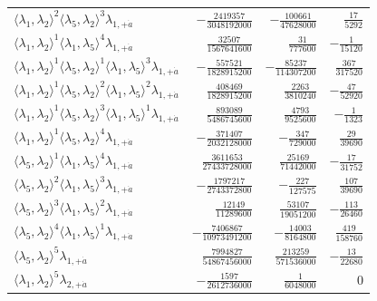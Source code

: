 \begin{longtable}{@{}lrrr@{}}
$\langle\lambda_1,\lambda_2\rangle^{2}\langle\lambda_5,\lambda_2\rangle^{3}\lambda_{1,+\dot a}$ & $-\frac{2419357}{3048192000}$ & $-\frac{100661}{47628000}$ & $\frac{17}{5292}$ \\
$\langle\lambda_1,\lambda_2\rangle^{1}\langle\lambda_1,\lambda_5\rangle^{4}\lambda_{1,+\dot a}$ & $\frac{32507}{1567641600}$ & $\frac{31}{777600}$ & $-\frac{1}{15120}$ \\
$\langle\lambda_1,\lambda_2\rangle^{1}\langle\lambda_5,\lambda_2\rangle^{1}\langle\lambda_1,\lambda_5\rangle^{3}\lambda_{1,+\dot a}$ & $-\frac{557521}{1828915200}$ & $-\frac{85237}{114307200}$ & $\frac{367}{317520}$ \\
$\langle\lambda_1,\lambda_2\rangle^{1}\langle\lambda_5,\lambda_2\rangle^{2}\langle\lambda_1,\lambda_5\rangle^{2}\lambda_{1,+\dot a}$ & $\frac{408469}{1828915200}$ & $\frac{2263}{3810240}$ & $-\frac{47}{52920}$ \\
$\langle\lambda_1,\lambda_2\rangle^{1}\langle\lambda_5,\lambda_2\rangle^{3}\langle\lambda_1,\lambda_5\rangle^{1}\lambda_{1,+\dot a}$ & $\frac{893089}{5486745600}$ & $\frac{4793}{9525600}$ & $-\frac{1}{1323}$ \\
$\langle\lambda_1,\lambda_2\rangle^{1}\langle\lambda_5,\lambda_2\rangle^{4}\lambda_{1,+\dot a}$ & $-\frac{371407}{2032128000}$ & $-\frac{347}{729000}$ & $\frac{29}{39690}$ \\
$\langle\lambda_5,\lambda_2\rangle^{1}\langle\lambda_1,\lambda_5\rangle^{4}\lambda_{1,+\dot a}$ & $\frac{3611653}{27433728000}$ & $\frac{25169}{71442000}$ & $-\frac{17}{31752}$ \\
$\langle\lambda_5,\lambda_2\rangle^{2}\langle\lambda_1,\lambda_5\rangle^{3}\lambda_{1,+\dot a}$ & $-\frac{1797217}{2743372800}$ & $-\frac{227}{127575}$ & $\frac{107}{39690}$ \\
$\langle\lambda_5,\lambda_2\rangle^{3}\langle\lambda_1,\lambda_5\rangle^{2}\lambda_{1,+\dot a}$ & $\frac{12149}{11289600}$ & $\frac{53107}{19051200}$ & $-\frac{113}{26460}$ \\
$\langle\lambda_5,\lambda_2\rangle^{4}\langle\lambda_1,\lambda_5\rangle^{1}\lambda_{1,+\dot a}$ & $-\frac{7406867}{10973491200}$ & $-\frac{14003}{8164800}$ & $\frac{419}{158760}$ \\
$\langle\lambda_5,\lambda_2\rangle^{5}\lambda_{1,+\dot a}$ & $\frac{7994827}{54867456000}$ & $\frac{213259}{571536000}$ & $-\frac{13}{22680}$ \\
$\langle\lambda_1,\lambda_2\rangle^{5}\lambda_{2,+\dot a}$ & $-\frac{1597}{2612736000}$ & $\frac{1}{6048000}$ & $0$ \\

\end{longtable}
